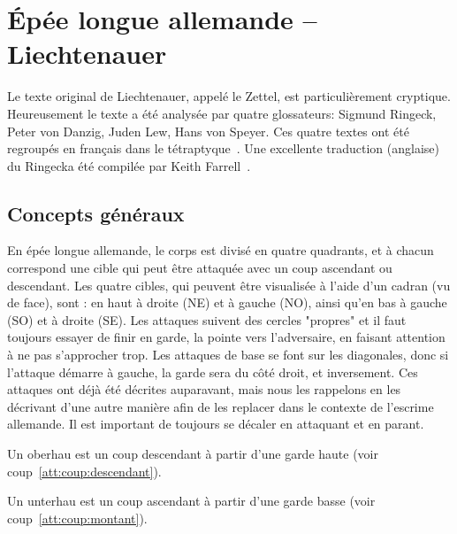 \chapter{Épée longue allemande -- Liechtenauer}
\label{chap:épée-longue-liechtenauer}


Le texte original de Liechtenauer, appelé le Zettel, est particulièrement cryptique.
Heureusement le texte a été analysée par quatre glossateurs: Sigmund Ringeck, Peter von Danzig, Juden Lew, Hans von Speyer.
Ces quatre textes ont été regroupés en français dans le tétraptyque~\cite{Liechtenauer:Ardamhe:2010:Tetraptyque}.
Une excellente traduction (anglaise) du Ringecka été compilée par Keith Farrell~\cite{Ringeck:Farrell:2014:CodexRingeck}.


\section{Concepts généraux}




En épée longue allemande, le corps est divisé en quatre quadrants, et à chacun correspond une cible qui peut être attaquée avec un coup ascendant ou descendant.
Les quatre cibles, qui peuvent être visualisée à l'aide d'un cadran (vu de face), sont : en haut à droite (NE) et à gauche (NO), ainsi qu'en bas à gauche (SO) et à droite (SE).
Les attaques suivent des cercles "propres" et il faut toujours essayer de finir en garde, la pointe vers l'adversaire, en faisant attention à ne pas s'approcher trop.
Les attaques de base se font sur les diagonales, donc si l'attaque démarre à gauche, la garde sera du côté droit, et inversement.
Ces attaques ont déjà été décrites auparavant, mais nous les rappelons en les décrivant d'une autre manière afin de les replacer dans le contexte de l'escrime allemande.
Il est important de toujours se décaler en attaquant et en parant.


\begin{coup}
\label{épée-longue:coup:oberhau}

Un oberhau est un coup descendant à partir d'une garde haute (voir coup~\ref{att:coup:descendant}).
\end{coup}


\begin{coup}
\label{épée-longue:coup:unterhau}

Un unterhau est un coup ascendant à partir d'une garde basse (voir coup~\ref{att:coup:montant}).
\end{coup}


